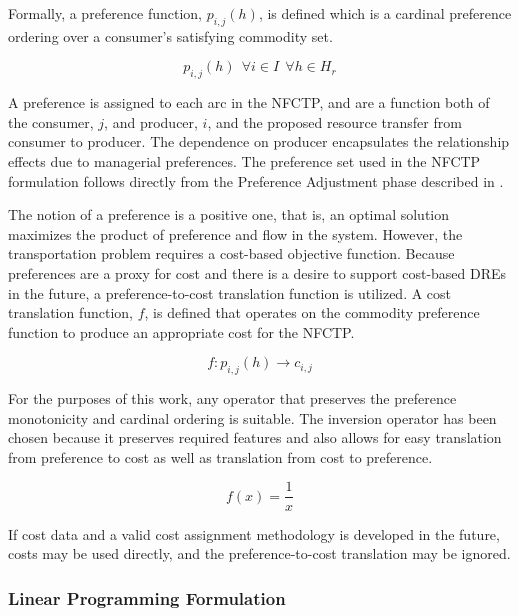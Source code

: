 Formally, a preference function, $p_{i, j}(h)$, is defined which is a cardinal
preference ordering over a consumer's satisfying commodity set.
 
\begin{equation}
p_{i, j}(h) \:\: \forall i \in I  \:\: \forall h \in H_{r} 
\end{equation}

\noindent
A preference is assigned to each arc in the NFCTP, and are a function both of
the consumer, $j$, and producer, $i$, and the proposed resource transfer from
consumer to producer. The dependence on producer encapsulates the relationship
effects due to managerial preferences. The preference set used in the NFCTP
formulation follows directly from the Preference Adjustment phase described in
.

The notion of a preference is a positive one, that is, an optimal solution
maximizes the product of preference and flow in the system. However, the
transportation problem requires a cost-based objective function. Because
preferences are a proxy for cost and there is a desire to support cost-based
DREs in the future, a preference-to-cost translation function is utilized. A
cost translation function, $f$, is defined that operates on the commodity
preference function to produce an appropriate cost for the NFCTP.

\begin{equation}
f : p_{i,j}(h) \to c_{i,j}
\end{equation}

\noindent
For the purposes of this work, any operator that preserves the preference
monotonicity and cardinal ordering is suitable.  The inversion operator has been
chosen because it preserves required features and also allows for easy
translation from preference to cost as well as translation from cost to
preference.

\begin{equation}
f(x) = \frac{1}{x}
\end{equation}

If cost data and a valid cost assignment methodology is developed in the future,
costs may be used directly, and the preference-to-cost translation may be
ignored.

\subsubsection{Linear Programming Formulation}\label{abm:dre:lp}

